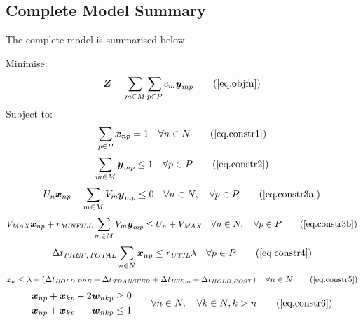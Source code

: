 \subsection{Complete Model Summary}\label{SS.completesummary}

The complete model is summarised below.

Minimise:
\begin{equation}
    \boldsymbol{Z} = \sum_{m \in M} \sum_{p \in P} c_m \boldsymbol{y}_{mp}
    \tag{\ref{eq.objfn}}
\end{equation}
Subject to:
\begin{equation}
    \sum_{p \in P} \boldsymbol{x}_{np} = 1 \quad \forall n \in N
    \tag{\ref{eq.constr1}}
\end{equation}
\begin{equation}
    \sum_{m \in M} \boldsymbol{y}_{mp} \le 1 \quad \forall p \in P
    \tag{\ref{eq.constr2}}
\end{equation}
\begin{equation}
    U_{n} \boldsymbol{x}_{np} - \sum_{m \in M} V_{m} \boldsymbol{y}_{mp} \le 0
    \quad \forall n \in N, \quad \forall p \in P
    \tag{\ref{eq.constr3a}}
\end{equation}
\begin{equation}
    V_{\mathit{MAX}} \boldsymbol{x}_{np} + r_{\mathit{MINFILL}} \sum_{m \in M}
    V_{m} \boldsymbol{y}_{mp} \le U_{n} + V_{\mathit{MAX}} \quad \forall n \in
    N, \quad \forall p \in P
    \tag{\ref{eq.constr3b}}
\end{equation}
\begin{equation}
    \Delta t_{\mathit{PREP,TOTAL}} \sum_{n \in N} \boldsymbol{x}_{np} \le 
    r_{\mathit{UTIL}} \lambda \quad \forall p \in P
    \tag{\ref{eq.constr4}}
\end{equation}
\begin{equation}
    \boldsymbol{z}_{n} \le \lambda - \left( \Delta t_{\mathit{HOLD,PRE}} +
    \Delta t_{\mathit{TRANSFER}} + \Delta t_{\mathit{USE},n} + \Delta
    t_{\mathit{HOLD,POST}} \right) \quad \forall n \in N
    \tag{\ref{eq.constr5}}
\end{equation}
\begin{equation}
    \begin{split}
        \begin{alignedat}{3}
            \boldsymbol{x}_{np} & {}+{} & \boldsymbol{x}_{kp} & {}-{} & 2
            \boldsymbol{w}_{nkp} & \ge 0\\
            \boldsymbol{x}_{np} & {}+{} & \boldsymbol{x}_{kp} & {}-{} &
            \boldsymbol{w}_{nkp} & \le 1\\
        \end{alignedat}
    \end{split}
    \quad\quad
    \begin{split}
        \forall n \in N, \quad \forall k \in N, k > n
    \end{split}
    \tag{\ref{eq.constr6}}
\end{equation}
